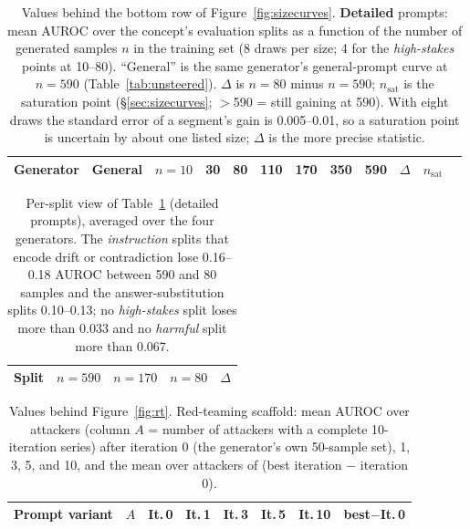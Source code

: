 \documentclass{article} %
\newcommand{\hs}{\emph{high-stakes}}
\newcommand{\harm}{\emph{harmful}}
\newcommand{\instr}{\emph{instruction}}
\begin{document}
\begin{table}[H]
  \caption{Values behind the bottom row of Figure~\ref{fig:sizecurves}. \textbf{Detailed} prompts: mean AUROC over the concept's evaluation splits as a function of the number of generated samples $n$ in the training set (8 draws per size; 4 for the \hs{} points at 10--80). ``General'' is the same generator's general-prompt curve at $n=590$ (Table~\ref{tab:unsteered}). $\Delta$ is $n{=}80$ minus $n{=}590$; $n_{\text{sat}}$ is the saturation point (\S\ref{sec:sizecurves}; $>$590 = still gaining at 590). With eight draws the standard error of a segment's gain is 0.005--0.01, so a saturation point is uncertain by about one listed size; $\Delta$ is the more precise statistic.}
  \label{tab:sizecurves}
  \centering\small
  \setlength{\tabcolsep}{4pt}
  \begin{tabular}{lcccccccccrr}
    \toprule
    Generator & General & $n{=}10$ & 30 & 80 & 110 & 170 & 350 & 590 & $\Delta$ & $n_{\text{sat}}$ \\
    \midrule
    
  \end{tabular}
\end{table}


\begin{table}[H]
  \caption{Per-split view of Table~\ref{tab:sizecurves} (detailed prompts), averaged over the four generators. The \instr{} splits that encode drift or contradiction lose 0.16--0.18 AUROC between 590 and 80 samples and the answer-substitution splits 0.10--0.13; no \hs{} split loses more than 0.033 and no \harm{} split more than 0.067.}
  \label{tab:persplit}
  \centering\small
  \setlength{\tabcolsep}{5pt}
  \begin{tabular}{lcccr}
    \toprule
    Split & $n{=}590$ & $n{=}170$ & $n{=}80$ & $\Delta$ \\
    \midrule
    
  \end{tabular}
\end{table}


\begin{table}[H]
  \caption{Values behind Figure~\ref{fig:rt}. Red-teaming scaffold: mean AUROC over attackers (column $A$ = number of attackers with a complete 10-iteration series) after iteration 0 (the generator's own 50-sample set), 1, 3, 5, and 10, and the mean over attackers of (best iteration $-$ iteration 0).}
  \label{tab:rt_iters}
  \centering\small
  \setlength{\tabcolsep}{4pt}
  \begin{tabular}{lcccccc r}
    \toprule
    Prompt variant & $A$ & It.\,0 & It.\,1 & It.\,3 & It.\,5 & It.\,10 & best$-$It.\,0 \\
    \midrule
    
  \end{tabular}
\end{table}
\end{document}
